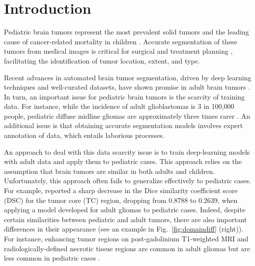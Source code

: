 \documentclass[runningheads]{llncs}
\begin{document}
\section{Introduction}
Pediatric brain tumors represent the most prevalent solid tumors and the leading cause of cancer-related mortality in children \cite{fathi2023automated}. Accurate segmentation of these tumors from medical images is critical for surgical and treatment planning \cite{menze2014multimodal,fathi2023automated}, facilitating the identification of tumor location, extent, and type. 



Recent advances in automated brain tumor segmentation, driven by deep learning techniques and well-curated datasets, have shown promise in adult brain tumors \cite{isensee2021nnu,luu2021extending,zeineldin2022multimodal}. In turn, an important issue for pediatric brain tumors is the scarcity of training data. For instance, while the incidence of adult glioblastomas is 3 in 100,000 people, pediatric diffuse midline gliomas are approximately three times rarer \cite{kazerooni2023brain}. An additional issue is that obtaining accurate segmentation models %
involves expert annotation of data, which entails laborious processes. 

An approach to deal with this data scarcity issue is to train deep-learning models with adult data and apply them to pediatric cases. This approach relies on the assumption that brain tumors are similar in both adults and children. Unfortunately, this approach often fails to generalize effectively to pediatric cases. For example, \cite{zeineldin2022multimodal} reported a sharp decrease in the Dice similarity coefficient score (DSC) for the tumor core (TC) region, dropping from 0.8788 to 0.2639, when applying a model developed for adult gliomas to pediatric cases.
Indeed, despite certain similarities between pediatric and adult tumors, there are also important differences in their appearance (see an example in Fig.~\ref{fig:domaindiff} (right)).
For instance, enhancing tumor regions on post-gadolinium T1-weighted MRI and radiologically-defined necrotic tissue regions are common in adult gliomas but are less common in pediatric cases \cite{kazerooni2023brain}. %
\end{document}
